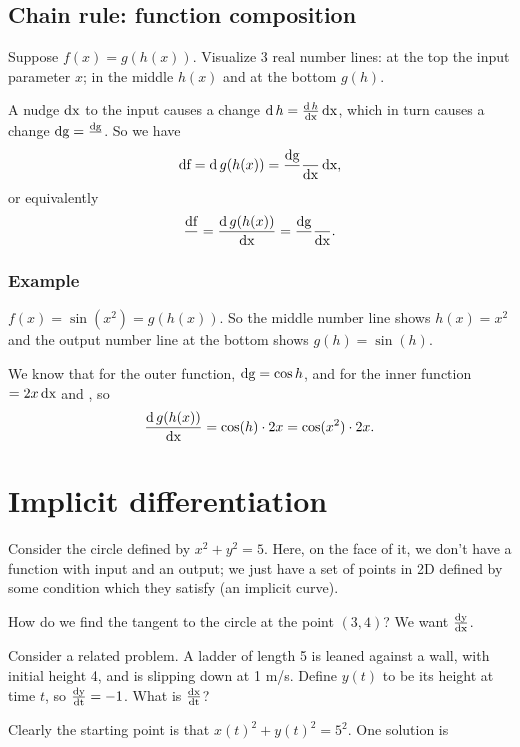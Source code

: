 \documentclass[12pt]{article}
\DeclareMathOperator{\df}{\text{df}}
\DeclareMathOperator{\dg}{\text{dg}}
\let\dh\relax\DeclareMathOperator{\dh}{\text{dh}}
\begin{document}
\subsection{Chain rule: function composition}
Suppose $f(x) = g(h(x))$. Visualize 3 real number lines: at the top the input
parameter $x$; in the middle $h(x)$ and at the bottom $g(h)$.

A nudge $\operatorname{\text{dx}}$ to the input causes a change $\operatorname{\text{d}} h = \frac{\operatorname{\text{d}} h}{\operatorname{\text{dx}}} \operatorname{\text{dx}}$, which in turn causes a
change $\dg = \frac{\dg}{\dh} \dh$. So we have
\begin{align*}
  \df = \d g(h(x)) = \frac{\dg}{\dh} \frac{\dh}{\dx} \dx,
\end{align*}
or equivalently
\begin{align*}
  \frac{\df}{\dh} = \frac{\d g(h(x))}{\dx} = \frac{\dg}{\dh} \frac{\dh}{\dx}.
\end{align*}

\subsubsection{Example}
$f(x) = \sin(x^2) = g(h(x))$. So the middle number line shows $h(x) = x^2$ and
the output number line at the bottom shows $g(h) = \sin(h)$.

We know that for the outer function, $\dg = \cos h \dh$, and for the inner
function $\dh = 2x \dx$ and , so
\begin{align*}
  \frac{\operatorname{\text{d}} g(h(x))}{\operatorname{\text{dx}}} = \cos (h) \cdot 2x = \cos(x^2)\cdot 2x.
\end{align*}

\newpage
\section{Implicit differentiation}
Consider the circle defined by $x^2 + y^2 = 5$. Here, on the face of it, we
don't have a function with input and an output; we just have a set of points in
2D defined by some condition which they satisfy (an implicit curve).

How do we find the tangent to the circle at the point $(3,4)$? We want $\frac{\operatorname{\text{dy}}}{\operatorname{\text{dx}}}$.

Consider a related problem. A ladder of length 5 is leaned against a wall, with
initial height 4, and is slipping down at 1 m/s. Define $y(t)$ to be its height
at time $t$, so $\frac{\operatorname{\text{dy}}}{\operatorname{\text{dt}}} = -1$. What is $\frac{\operatorname{\text{dx}}}{\operatorname{\text{dt}}}$?

Clearly the starting point is that $x(t)^2 + y(t)^2 = 5^2$. One solution is\\
\end{document}
